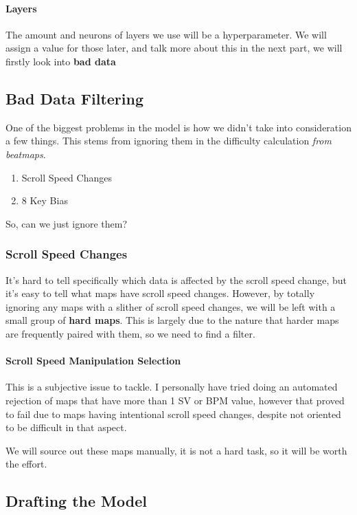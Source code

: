 \paragraph{Layers} The amount and neurons of layers we use will be a hyperparameter. We will assign a value for those later, and talk more about this in the next part, we will firstly look into \textbf{bad data}

\subsection{Bad Data Filtering}

One of the biggest problems in the model is how we didn't take into consideration a few things. This stems from ignoring them in the difficulty calculation \textit{from beatmaps}.

\begin{enumerate}
	\item Scroll Speed Changes
	\item 8 Key Bias
\end{enumerate}

So, can we just ignore them?

\subsubsection{Scroll Speed Changes}

It's hard to tell specifically which data is affected by the scroll speed change, but it's easy to tell what maps have scroll speed changes. However, by totally ignoring any maps with a slither of scroll speed changes, we will be left with a small group of \textbf{hard maps}. This is largely due to the nature that harder maps are frequently paired with them, so we need to find a filter.

\paragraph{Scroll Speed Manipulation Selection}

This is a subjective issue to tackle. I personally have tried doing an automated rejection of maps that have more than 1 SV or BPM value, however that proved to fail due to maps having intentional scroll speed changes, despite not oriented to be difficult in that aspect.

We will source out these maps manually, it is not a hard task, so it will be worth the effort.


\subsection{Drafting the Model}

